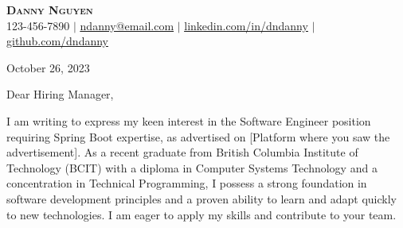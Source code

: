 \documentclass[letterpaper,11pt]{article}
\begin{document}
\begin{center}
\textbf{\Huge \scshape Danny Nguyen} \\ \vspace{1pt}
\small 123-456-7890 $|$ \href{mailto:ndanny@email.com}{\underline{ndanny@email.com}} $|$
\href{https://linkedin.com/in/dndanny}{\underline{linkedin.com/in/dndanny}} $|$
\href{https://github.com/dndanny}{\underline{github.com/dndanny}}
\end{center}

\vspace{20pt}
October 26, 2023

\vspace{20pt}

\vspace{10pt}
Dear Hiring Manager, \\
\vspace{10pt}

\vspace{10pt}
I am writing to express my keen interest in the Software Engineer position requiring Spring Boot expertise, as advertised on [Platform where you saw the advertisement]. As a recent graduate from British Columbia Institute of Technology (BCIT) with a diploma in Computer Systems Technology and a concentration in Technical Programming, I possess a strong foundation in software development principles and a proven ability to learn and adapt quickly to new technologies. I am eager to apply my skills and contribute to your team.
\vspace{10pt}
\end{document}
